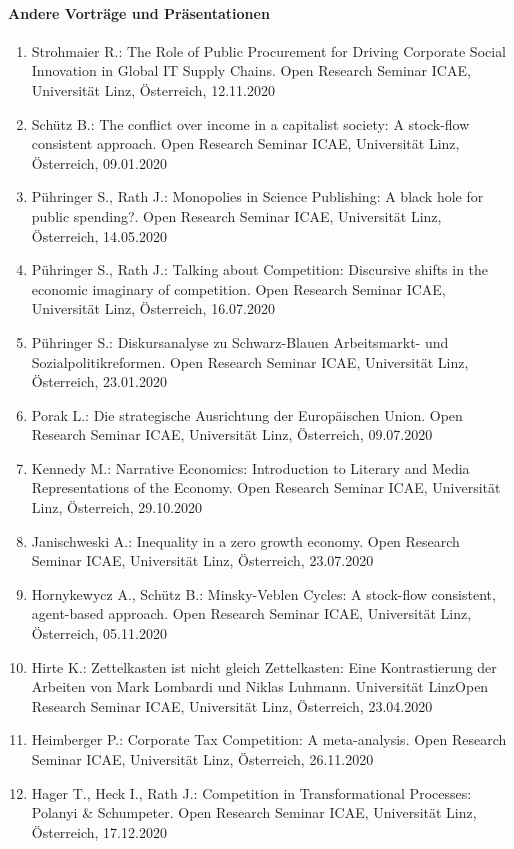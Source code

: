 \paragraph{Andere Vorträge und Präsentationen}
\begin{enumerate}
	\item Strohmaier R.: The Role of Public Procurement for Driving Corporate Social Innovation in Global IT Supply Chains. Open Research Seminar ICAE, Universität Linz, Österreich, 12.11.2020
	\item Schütz B.: The conflict over income in a capitalist society: A stock-flow consistent approach. Open Research Seminar ICAE, Universität Linz, Österreich, 09.01.2020
	\item Pühringer S., Rath J.: Monopolies in Science Publishing: A black hole for public spending?. Open Research Seminar ICAE, Universität Linz, Österreich, 14.05.2020
	\item Pühringer S., Rath J.: Talking about Competition: Discursive shifts in the economic imaginary of competition. Open Research Seminar ICAE, Universität Linz, Österreich, 16.07.2020
	\item Pühringer S.: Diskursanalyse zu Schwarz-Blauen Arbeitsmarkt- und Sozialpolitikreformen. Open Research Seminar ICAE, Universität Linz, Österreich, 23.01.2020
	\item Porak L.: Die strategische Ausrichtung der Europäischen Union. Open Research Seminar ICAE, Universität Linz, Österreich, 09.07.2020
	\item Kennedy M.: Narrative Economics: Introduction to Literary and Media Representations of the Economy. Open Research Seminar ICAE, Universität Linz, Österreich, 29.10.2020
	\item Janischweski A.: Inequality in a zero growth economy. Open Research Seminar ICAE, Universität Linz, Österreich, 23.07.2020
	\item Hornykewycz A., Schütz B.: Minsky-Veblen Cycles: A stock-flow consistent, agent-based approach. Open Research Seminar ICAE, Universität Linz, Österreich, 05.11.2020
	\item Hirte K.: Zettelkasten ist nicht gleich Zettelkasten: Eine Kontrastierung  der Arbeiten von Mark Lombardi und Niklas Luhmann. Universität LinzOpen Research Seminar ICAE, Universität Linz, Österreich, 23.04.2020
	\item Heimberger P.: Corporate Tax Competition: A meta-analysis. Open Research Seminar ICAE, Universität Linz, Österreich, 26.11.2020
	\item Hager T., Heck I., Rath J.: Competition in Transformational Processes: Polanyi & Schumpeter. Open Research Seminar ICAE, Universität Linz, Österreich, 17.12.2020

\end{enumerate}

